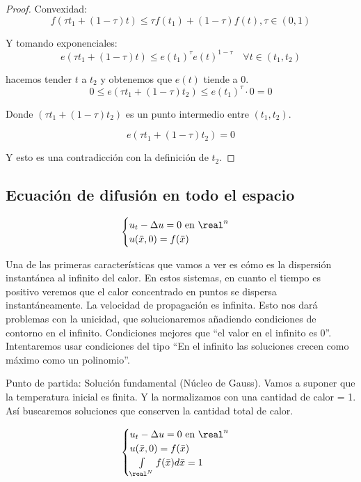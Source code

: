 \begin{proof}
			\begin{minipage}[t]{\linewidth}
			\end{minipage}

			Convexidad:
			\[f(\tau t_1 + (1-\tau)t) \leq \tau f(t_1) + (1-\tau) f(t), \tau \in (0,1)\]

			Y tomando exponenciales:
			\[e(\tau t_1 + (1-\tau)t) \leq e(t_1)^\tau e(t)^{1-\tau} \quad \forall t \in (t_1,t_2)\]

			hacemos tender $t$ a $t_2$ y obtenemos que $e(t)$ tiende a 0.
			\[ 0 \leq e(\tau t_1 + (1-\tau)t_2) \leq e(t_1)^\tau \cdot 0 = 0\]

			Donde $(\tau t_1 + (1-\tau)t_2)$ es un punto intermedio entre $(t_1,t_2)$.

			\[e(\tau t_1+(1-\tau)t_2) = 0\]

			Y esto es una contradicción con la definición de $t_2$.

		\end{proof}

	\subsection{Ecuación de difusión en todo el espacio}

		\[\begin{cases}
			u_t - \Delta u = 0 \text{ en } \real^n\\
			u(\bar{x},0) = f(\bar{x})
		\end{cases}\]

		Una de las primeras características que vamos a ver es cómo es la dispersión instantánea al infinito del calor. En estos sistemas, en cuanto el tiempo es positivo veremos que el calor concentrado en puntos se dispersa instantáneamente. La velocidad de propagación es infinita. Esto nos dará problemas con la unicidad, que solucionaremos añadiendo condiciones de contorno en el infinito. Condiciones mejores que ``el valor en el infinito es 0''. Intentaremos usar condiciones del tipo ``En el infinito las soluciones crecen como máximo como un polinomio''.

		Punto de partida: Solución fundamental (Núcleo de Gauss). Vamos a suponer que la temperatura inicial es finita. Y la normalizamos con una cantidad de calor = 1. Así buscaremos soluciones que conserven la cantidad total de calor.

		\[\begin{cases}
			u_t - \Delta u = 0 \text{ en } \real^n\\
			u(\bar{x},0) = f(\bar{x}) \\
			\int\limits_{\real^N} f(\bar{x}) d\bar{x} = 1
		\end{cases}\]

